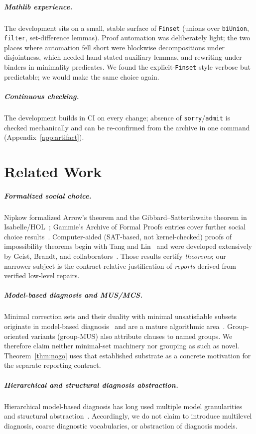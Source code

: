 \documentclass[sigplan,10pt,review,anonymous]{acmart}
\theoremstyle{acmdefinition}
\newcommand{\code}[1]{\texttt{#1}}
\begin{document}
\subparagraph*{Mathlib experience.} The development sits on a small, stable
surface of \code{Finset} (unions over \code{biUnion}, \code{filter},
set-difference lemmas). Proof automation was deliberately light; the two
places where automation fell short were blockwise decompositions under
disjointness, which needed hand-stated auxiliary lemmas, and rewriting under
binders in minimality predicates. We found the explicit-\code{Finset} style
verbose but predictable; we would make the same choice again.

\subparagraph*{Continuous checking.} The development builds in CI on every
change; absence of \code{sorry}/\code{admit} is checked mechanically and can
be re-confirmed from the archive in one command
(Appendix~\ref{app:artifact}).

\section{Related Work}
\label{sec:related}

\subparagraph*{Formalized social choice.} Nipkow formalized Arrow's theorem
and the Gibbard--Satterthwaite theorem in Isabelle/HOL~\cite{Nipkow2009};
Gammie's Archive of Formal Proofs entries cover further social choice
results~\cite{GammieAFP}. Computer-aided (SAT-based, not kernel-checked)
proofs of impossibility theorems begin with Tang and
Lin~\cite{TangLin2009} and were developed extensively by Geist, Brandt, and
collaborators~\cite{GeistEndriss2011,BrandtGeist2016}. Those results certify
\emph{theorems}; our narrower subject is the contract-relative justification
of \emph{reports} derived from verified low-level repairs.

\subparagraph*{Model-based diagnosis and MUS/MCS.} Minimal correction sets and their duality
with minimal unsatisfiable subsets originate in model-based
diagnosis~\cite{Reiter1987} and are a mature algorithmic
area~\cite{LiffitonSakallah2008,MarquesSilva2013}. Group-oriented variants
(group-MUS) also attribute clauses to named groups. We therefore claim neither
minimal-set machinery nor grouping as such as novel. Theorem~\ref{thm:nogo}
uses that established substrate as a concrete motivation for the separate
reporting contract.

\subparagraph*{Hierarchical and structural diagnosis abstraction.}
Hierarchical model-based diagnosis has long used multiple model granularities
and structural abstraction~\cite{Mozetic1991,ChittaroRanon2004}. Accordingly,
we do not claim to introduce multilevel diagnosis, coarse diagnostic
vocabularies, or abstraction of diagnosis models.
\end{document}
